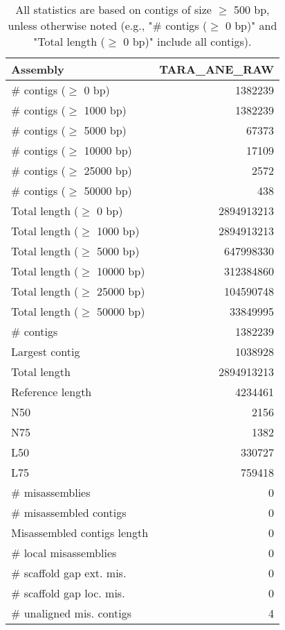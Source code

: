 \documentclass[12pt,a4paper]{article}
\begin{document}
\begin{table}[ht]
\begin{center}
\caption{All statistics are based on contigs of size $\geq$ 500 bp, unless otherwise noted (e.g., "\# contigs ($\geq$ 0 bp)" and "Total length ($\geq$ 0 bp)" include all contigs).}
\begin{tabular}{|l*{1}{|r}|}
\hline
Assembly & TARA\_ANE\_RAW \\ \hline
\# contigs ($\geq$ 0 bp) & 1382239 \\ \hline
\# contigs ($\geq$ 1000 bp) & 1382239 \\ \hline
\# contigs ($\geq$ 5000 bp) & 67373 \\ \hline
\# contigs ($\geq$ 10000 bp) & 17109 \\ \hline
\# contigs ($\geq$ 25000 bp) & 2572 \\ \hline
\# contigs ($\geq$ 50000 bp) & 438 \\ \hline
Total length ($\geq$ 0 bp) & 2894913213 \\ \hline
Total length ($\geq$ 1000 bp) & 2894913213 \\ \hline
Total length ($\geq$ 5000 bp) & 647998330 \\ \hline
Total length ($\geq$ 10000 bp) & 312384860 \\ \hline
Total length ($\geq$ 25000 bp) & 104590748 \\ \hline
Total length ($\geq$ 50000 bp) & 33849995 \\ \hline
\# contigs & 1382239 \\ \hline
Largest contig & 1038928 \\ \hline
Total length & 2894913213 \\ \hline
Reference length & 4234461 \\ \hline
N50 & 2156 \\ \hline
N75 & 1382 \\ \hline
L50 & 330727 \\ \hline
L75 & 759418 \\ \hline
\# misassemblies & 0 \\ \hline
\# misassembled contigs & 0 \\ \hline
Misassembled contigs length & 0 \\ \hline
\# local misassemblies & 0 \\ \hline
\# scaffold gap ext. mis. & 0 \\ \hline
\# scaffold gap loc. mis. & 0 \\ \hline
\# unaligned mis. contigs & 4 \\ \hline

\end{tabular}
\end{center}
\end{table}
\end{document}
